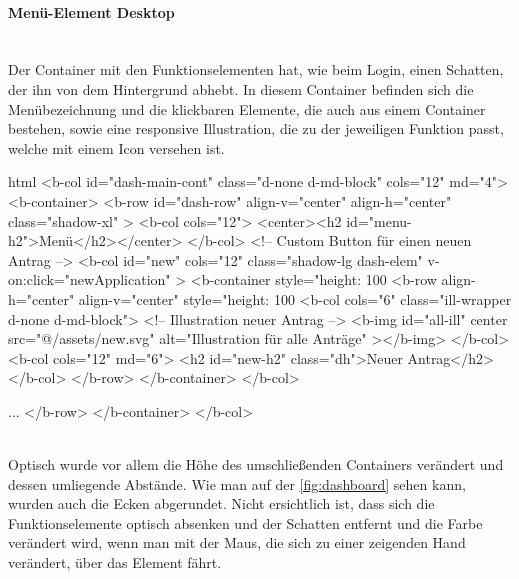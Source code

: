 \paragraph{Menü-Element Desktop}
~\\
Der Container mit den Funktionselementen hat, wie beim Login, einen Schatten, der ihn von dem Hintergrund abhebt. In diesem Container befinden sich die Menübezeichnung und die klickbaren Elemente, die auch aus einem Container bestehen, sowie eine responsive Illustration, die zu der jeweiligen Funktion passt, welche mit einem Icon versehen ist. 
\begin{code}{html}
<b-col id="dash-main-cont" class="d-none d-md-block" cols="12" md="4">
	<b-container>
		<b-row
			id="dash-row"
			align-v="center"
			align-h="center"
			class="shadow-xl"
		>
			<b-col cols="12">
				<center><h2 id="menu-h2">Menü</h2></center>
			</b-col>
			<!-- Custom Button für einen neuen Antrag -->
			<b-col
				id="new"
				cols="12"
				class="shadow-lg dash-elem"
				v-on:click="newApplication"
			>
				<b-container style="height: 100%
					<b-row align-h="center" align-v="center" style="height: 100%
						<b-col cols="6" class="ill-wrapper d-none d-md-block">
						<!-- Illustration neuer Antrag -->
							<b-img
								id="all-ill"
								center
								src="@/assets/new.svg"
								alt="Illustration für alle Anträge"
							></b-img>
						</b-col>
						<b-col cols="12" md="6">
							<h2 id="new-h2" class="dh">Neuer Antrag</h2>
						</b-col>
					</b-row>
				</b-container>
			</b-col>
			
			...
		</b-row>
	</b-container>
</b-col>
\end{code}
	\label{list:menuhtml} ~\\
Optisch wurde vor allem die Höhe des umschließenden Containers verändert und dessen umliegende Abstände. Wie man auf der \autoref{fig:dashboard} sehen kann, wurden auch die Ecken abgerundet. Nicht ersichtlich ist, dass sich die Funktionselemente optisch absenken und der Schatten entfernt und die Farbe verändert wird, wenn man mit der Maus, die sich zu einer zeigenden Hand verändert, über das Element fährt. 
	\label{list:cssmenu} ~\\
